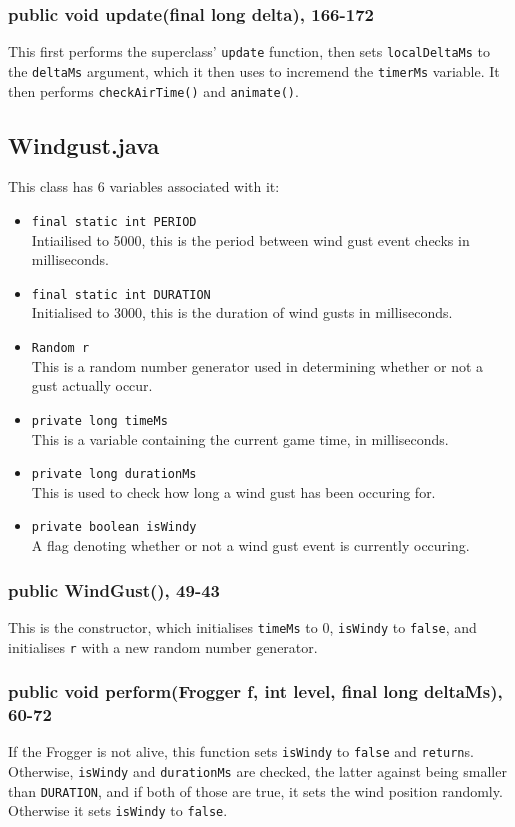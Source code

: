 \documentclass[12pt]{article}
\begin{document}
\subsubsection{public void update(final long delta), 166-172}
This first performs the superclass' \verb|update| function, then sets \verb|localDeltaMs| to the \verb|deltaMs| argument, which it then uses to incremend the \verb|timerMs| variable.
It then performs \verb|checkAirTime()| and \verb|animate()|.

\subsection{Windgust.java}
This class has 6 variables associated with it:
\begin{itemize}
  \item \verb|final static int PERIOD|\\
        Intiailised to 5000, this is the period between wind gust event checks in milliseconds.
  \item \verb|final static int DURATION|\\
        Initialised to 3000, this is the duration of wind gusts in milliseconds.
  \item \verb|Random r|\\
        This is a random number generator used in determining whether or not a gust actually occur.
  \item \verb|private long timeMs|\\
        This is a variable containing the current game time, in milliseconds.
  \item \verb|private long durationMs|\\
        This is used to check how long a wind gust has been occuring for.
  \item \verb|private boolean isWindy|\\
        A flag denoting whether or not a wind gust event is currently occuring.
\end{itemize}

\subsubsection{public WindGust(), 49-43}
This is the constructor, which initialises \verb|timeMs| to 0, \verb|isWindy| to \verb|false|, and initialises \verb|r| with a new random number generator.

\subsubsection{public void perform(Frogger f, int level, final long deltaMs), 60-72}
If the Frogger is not alive, this function sets \verb|isWindy| to \verb|false| and \verb|return|s.
Otherwise, \verb|isWindy| and \verb|durationMs| are checked, the latter against being smaller than \verb|DURATION|, and if both of those are true, it sets the wind position randomly.
Otherwise it sets \verb|isWindy| to \verb|false|.
\end{document}
